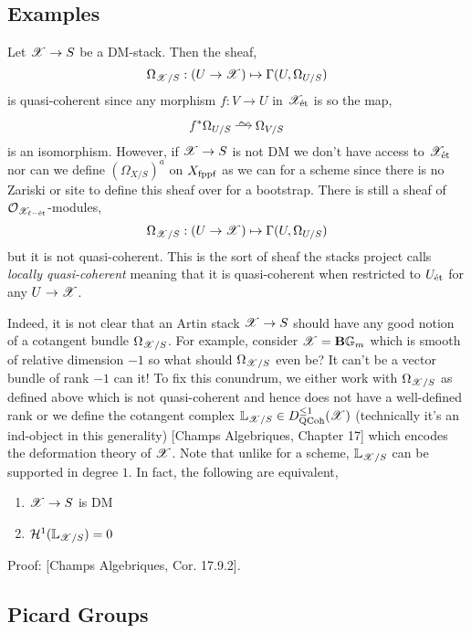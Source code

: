 \documentclass[12pt]{article}
\begin{document}
\subsection{Examples}

\begin{example}
Let $\mathscr{X} \to S$ be a DM-stack. Then the sheaf,
\[ \Omega_{\mathscr{X}/S} : (U \to \mathscr{X}) \mapsto \Gamma(U, \Omega_{U/S}) \]
is quasi-coherent since any morphism $f : V \to U$ in $\mathscr{X}_{\text{\'{e}t}}$ is \etale so the map,
\[ f^* \Omega_{U/S} \iso \Omega_{V/S} \]
is an isomorphism. However, if $\mathscr{X} \to S$ is not DM we don't have access to $\mathscr{X}_{\text{\'{e}t}}$ nor can we define $(\Omega_{X/S})^a$ on $X_{\mathrm{fppf}}$ as we can for a scheme since there is no Zariski or \etale site to define this sheaf over for a bootstrap. There is still a sheaf of $\mathcal{O}_{\mathscr{X}_{\ell-\text{\'{e}t}}}$-modules,
\[ \Omega_{\mathscr{X}/S} : (U \to \mathscr{X}) \mapsto \Gamma(U, \Omega_{U/S}) \]
but it is not quasi-coherent. This is the sort of sheaf the stacks project calls \textit{locally quasi-coherent} meaning that it is quasi-coherent when restricted to $U_{\text{\'{e}t}}$ for any $U \to \mathscr{X}$. 
\end{example}

\newcommand{\LL}{\mathbb{L}}

\begin{rmk}
Indeed, it is not clear that an Artin stack $\mathscr{X} \to S$ should have any good notion of a cotangent bundle $\Omega_{\mathscr{X}/S}$. For example, consider $\mathscr{X} = \mathbf{B} \mathbb{G}_m$ which is smooth of relative dimension $-1$ so what should $\Omega_{\mathscr{X}/S}$ even be? It can't be a vector bundle of rank $-1$ can it! To fix this conundrum, we either work with $\Omega_{\mathscr{X}/S}$ as defined above which is not quasi-coherent and hence does not have a well-defined rank or we define the cotangent complex $\LL_{\X/S} \in D_{\QCoh}^{\le 1}(\X)$ (technically it's an ind-object in this generality) [Champs Algebriques, Chapter 17] which encodes the deformation theory of $\mathscr{X}$. Note that unlike for a scheme, $\LL_{\X/S}$ can be supported in degree $1$. In fact, the following are equivalent,
\begin{enumerate}
\item $\mathscr{X} \to S$ is DM
\item $\cH^1(\LL_{\X/S}) = 0$
\end{enumerate}
Proof: [Champs Algebriques, Cor. 17.9.2]. 
\end{rmk}


\subsection{Picard Groups}
\end{document}
